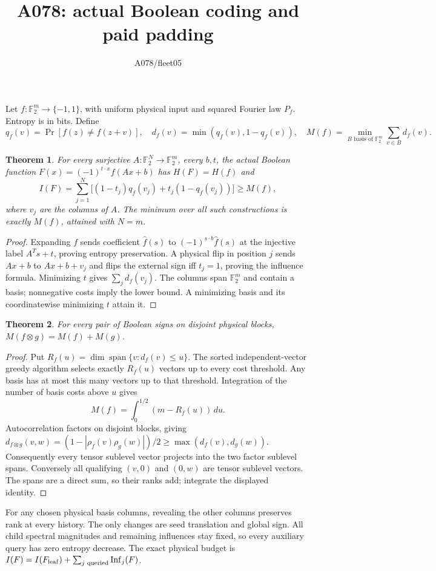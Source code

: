 \documentclass{article}
\newtheorem{theorem}{Theorem}
\newcommand{\F}{\mathbb F_2}
\begin{document}
\title{A078: actual Boolean coding and paid padding}\author{A078/fleet05}\maketitle
Let $f:\F^m\to\{-1,1\}$, with uniform physical input and squared Fourier law $P_f$. Entropy is in bits. Define
\[
q_f(v)=\Pr[f(z)\ne f(z+v)],\quad
d_f(v)=\min(q_f(v),1-q_f(v)),\quad
M(f)=\min_{B\text{ basis of }\F^m}\sum_{v\in B}d_f(v).
\]
\begin{theorem}
For every surjective $A:\F^N\to\F^m$, every $b,t$, the actual Boolean function
$F(x)=(-1)^{t\cdot x}f(Ax+b)$ has $H(F)=H(f)$ and
\[
I(F)=\sum_{j=1}^N\bigl[(1-t_j)q_f(v_j)+t_j(1-q_f(v_j))\bigr]\ge M(f),
\]
where $v_j$ are the columns of $A$. The minimum over all such constructions is exactly $M(f)$, attained with $N=m$.
\end{theorem}
\begin{proof}
Expanding $f$ sends coefficient $\widehat f(s)$ to
$(-1)^{s\cdot b}\widehat f(s)$ at the injective label $A^Ts+t$, proving entropy preservation. A physical flip in position $j$ sends $Ax+b$ to $Ax+b+v_j$ and flips the external sign iff $t_j=1$, proving the influence formula. Minimizing $t$ gives $\sum_jd_f(v_j)$. The columns span $\F^m$ and contain a basis; nonnegative costs imply the lower bound. A minimizing basis and its coordinatewise minimizing $t$ attain it.
\end{proof}
\begin{theorem}
For every pair of Boolean signs on disjoint physical blocks,
$M(f\otimes g)=M(f)+M(g)$.
\end{theorem}
\begin{proof}
Put $R_f(u)=\dim\operatorname{span}\{v:d_f(v)\le u\}$. The sorted independent-vector greedy algorithm selects exactly $R_f(u)$ vectors up to every cost threshold. Any basis has at most this many vectors up to that threshold. Integration of the number of basis costs above $u$ gives
\[
M(f)=\int_0^{1/2}(m-R_f(u))\,du.
\]
Autocorrelation factors on disjoint blocks, giving
$d_{f\otimes g}(v,w)=(1-|\rho_f(v)\rho_g(w)|)/2\ge\max(d_f(v),d_g(w))$.
Consequently every tensor sublevel vector projects into the two factor sublevel spans. Conversely all qualifying $(v,0)$ and $(0,w)$ are tensor sublevel vectors. The spans are a direct sum, so their ranks add; integrate the displayed identity.
\end{proof}
For any chosen physical basis columns, revealing the other columns preserves rank at every history. The only changes are seed translation and global sign. All child spectral magnitudes and remaining influences stay fixed, so every auxiliary query has zero entropy decrease. The exact physical budget is
$I(F)=I(F_{\rm leaf})+\sum_{j\text{ queried}}\operatorname{Inf}_j(F)$.
\end{document}

